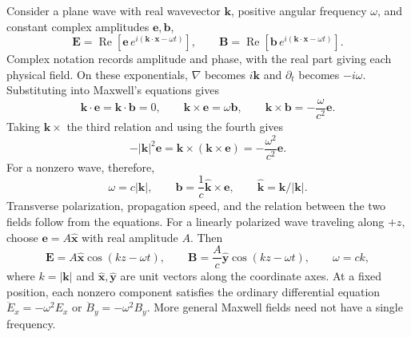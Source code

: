 \documentclass[11pt,letterpaper]{article}
\newcommand{\E}{\mathbf E}
\newcommand{\B}{\mathbf B}
\begin{document}
Consider a plane wave with real wavevector $\mathbf k$, positive angular frequency $\omega$, and constant complex amplitudes $\mathbf e,\mathbf b$,
\begin{equation}
\E=\operatorname{Re}\!\left[\mathbf e\,e^{i(\mathbf k\cdot\mathbf x-\omega t)}\right],\qquad
\B=\operatorname{Re}\!\left[\mathbf b\,e^{i(\mathbf k\cdot\mathbf x-\omega t)}\right].
\end{equation}
Complex notation records amplitude and phase, with the real part giving each physical field. On these exponentials, $\nabla$ becomes $i\mathbf k$ and $\partial_t$ becomes $-i\omega$. Substituting into Maxwell's equations gives
\begin{equation}
\mathbf k\cdot\mathbf e=\mathbf k\cdot\mathbf b=0,\qquad
\mathbf k\times\mathbf e=\omega\mathbf b,\qquad
\mathbf k\times\mathbf b=-\frac{\omega}{c^2}\mathbf e.
\end{equation}
Taking $\mathbf k\times$ the third relation and using the fourth gives
\begin{equation}
-|\mathbf k|^2\mathbf e
=\mathbf k\times(\mathbf k\times\mathbf e)
=-\frac{\omega^2}{c^2}\mathbf e.
\end{equation}
For a nonzero wave, therefore,
\begin{equation}\boxed{
\omega=c|\mathbf k|,\qquad
\mathbf b=\frac1c\widehat{\mathbf k}\times\mathbf e,\qquad
\widehat{\mathbf k}=\mathbf k/|\mathbf k|.}
\end{equation}
Transverse polarization, propagation speed, and the relation between the two fields follow from the equations. For a linearly polarized wave traveling along $+z$, choose $\mathbf e=A\hat{\mathbf x}$ with real amplitude $A$. Then
\begin{equation}
\E=A\hat{\mathbf x}\cos(kz-\omega t),\qquad
\B=\frac A c\hat{\mathbf y}\cos(kz-\omega t),\qquad \omega=ck,
\end{equation}
where $k=|\mathbf k|$ and $\hat{\mathbf x},\hat{\mathbf y}$ are unit vectors along the coordinate axes. At a fixed position, each nonzero component satisfies the ordinary differential equation $\ddot E_x=-\omega^2E_x$ or $\ddot B_y=-\omega^2B_y$. More general Maxwell fields need not have a single frequency.
\end{document}

